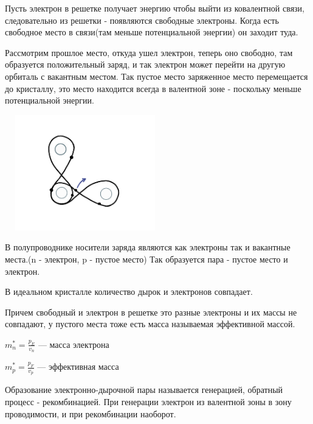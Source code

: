 \documentclass[../main.tex]{subfiles}
\begin{document}
Пусть электрон в решетке получает энергию чтобы выйти из ковалентной связи, следовательно из решетки - появляются свободные электроны.
Когда есть свободное место в связи(там меньше потенциальной энергии) он заходит туда.

Рассмотрим прошлое место, откуда ушел электрон, теперь оно свободно, там образуется положительный заряд, и так электрон может перейти на другую орбиталь с вакантным местом.
Так пустое место заряженное место перемещается до кристаллу, это место находится всегда в валентной зоне - поскольку меньше потенциальной энергии.

\begin{center}
    \includegraphics[height=5cm, width=7cm]{../img/kvantovy12.png}
\end{center}

В полупроводнике носители заряда являются как электроны так и вакантные места.(n - электрон, p - пустое место)
Так образуется пара - пустое место и электрон. 

В идеальном кристалле количество дырок и электронов совпадает.

Причем свободный и электрон в решетке это разные электроны и их массы не совпадают, у пустого места тоже есть масса называемая эффективной массой.

\begin{center}
    \(\displaystyle m^{*}_n = \frac{p_E}{v_n}\) --- масса электрона   
\end{center}

\begin{center}
    \(\displaystyle m^{*}_p = \frac{p_F}{v_p}\) --- эффективная масса   
\end{center}


 Образование электронно-дырочной пары называется генерацией, обратный процесс - рекомбинацией. 
При генерации электрон из валентной зоны в зону проводимости, и при рекомбинации наоборот.

\vspace{15px}
\end{document}
